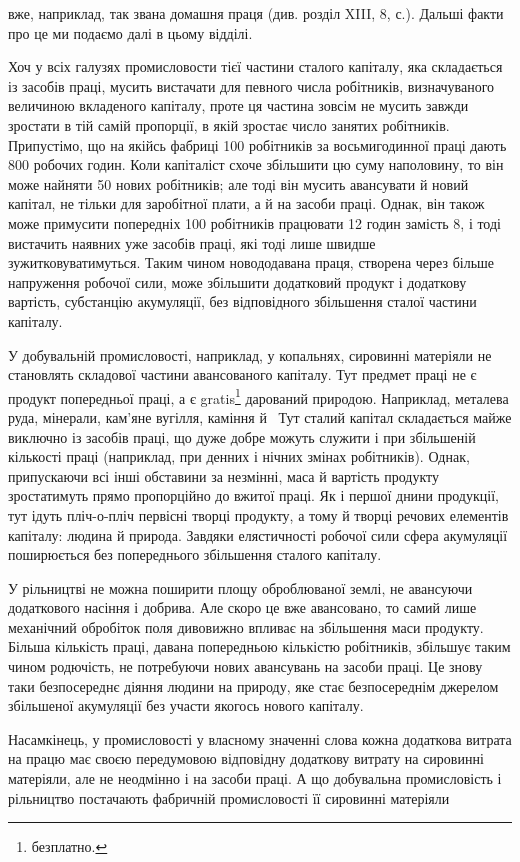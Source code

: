 \parcont{}  %
вже, наприклад, так звана домашня праця (див. розділ XIII,
8, с.). Дальші факти про це ми подаємо далі в цьому відділі.

Хоч у всіх галузях промисловости тієї частини сталого капіталу,
яка складається із засобів праці, мусить вистачати для
певного числа робітників, визначуваного величиною вкладеного
капіталу, проте ця частина зовсім не мусить завжди зростати в
тій самій пропорції, в якій зростає число занятих робітників.
Припустімо, що на якійсь фабриці 100 робітників за восьмигодинної
праці дають 800 робочих годин. Коли капіталіст схоче
збільшити цю суму наполовину, то він може найняти 50 нових
робітників; але тоді він мусить авансувати й новий капітал,
не тільки для заробітної плати, а й на засоби праці. Однак, він
також може примусити попередніх 100 робітників працювати
12 годин замість 8, і тоді вистачить наявних уже засобів праці,
які тоді лише швидше зужитковуватимуться. Таким чином новододавана
праця, створена через більше напруження робочої сили,
може збільшити додатковий продукт і додаткову вартість, субстанцію
акумуляції, без відповідного збільшення сталої частини
капіталу.

У добувальній промисловості, наприклад, у копальнях, сировинні
матеріяли не становлять складової частини авансованого
капіталу. Тут предмет праці не є продукт попередньої праці, а
є gratis\footnote*{
безплатно. 
} дарований природою. Наприклад, металева руда, мінерали,
кам’яне вугілля, каміння й~ Тут сталий капітал складається
майже виключно із засобів праці, що дуже добре можуть
служити і при збільшеній кількості праці (наприклад, при денних
і нічних змінах робітників). Однак, припускаючи всі інші
обставини за незмінні, маса й вартість продукту зростатимуть
прямо пропорційно до вжитої праці. Як і першої днини продукції,
тут ідуть пліч-о-пліч первісні творці продукту, а тому й творці
речових елементів капіталу: людина й природа. Завдяки елястичності
робочої сили сфера акумуляції поширюється без попереднього
збільшення сталого капіталу.

У рільництві не можна поширити площу оброблюваної землі,
не авансуючи додаткового насіння і добрива. Але скоро це вже
авансовано, то самий лише механічний обробіток поля дивовижно
впливає на збільшення маси продукту. Більша кількість
праці, давана попередньою кількістю робітників, збільшує таким
чином родючість, не потребуючи нових авансувань на засоби
праці. Це знову таки безпосереднє діяння людини на природу,
яке стає безпосереднім джерелом збільшеної акумуляції без
участи якогось нового капіталу.

Насамкінець, у промисловості у власному значенні слова
кожна додаткова витрата на працю має своєю передумовою відповідну
додаткову витрату на сировинні матеріяли, але не неодмінно
і на засоби праці. А що добувальна промисловість і рільництво
постачають фабричній промисловості її сировинні матеріяли
\parbreak{}  %
